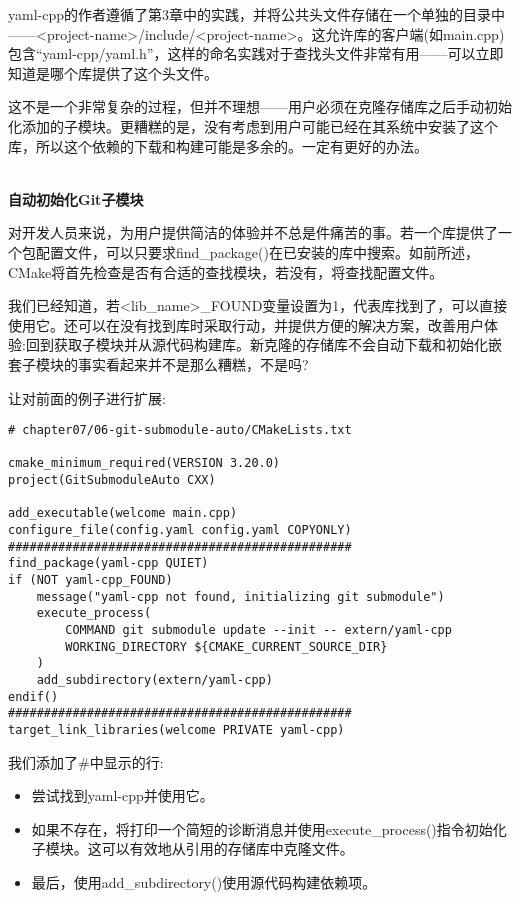 yaml-cpp的作者遵循了第3章中的实践，并将公共头文件存储在一个单独的目录中——<project-name>/include/<project-name>。这允许库的客户端(如main.cpp)包含“yaml-cpp/yaml.h”，这样的命名实践对于查找头文件非常有用——可以立即知道是哪个库提供了这个头文件。

这不是一个非常复杂的过程，但并不理想——用户必须在克隆存储库之后手动初始化添加的子模块。更糟糕的是，没有考虑到用户可能已经在其系统中安装了这个库，所以这个依赖的下载和构建可能是多余的。一定有更好的办法。

\hspace*{\fill} \\ %
\noindent
\textbf{自动初始化Git子模块}

对开发人员来说，为用户提供简洁的体验并不总是件痛苦的事。若一个库提供了一个包配置文件，可以只要求find\_package()在已安装的库中搜索。如前所述，CMake将首先检查是否有合适的查找模块，若没有，将查找配置文件。

我们已经知道，若<lib\_name>\_FOUND变量设置为1，代表库找到了，可以直接使用它。还可以在没有找到库时采取行动，并提供方便的解决方案，改善用户体验:回到获取子模块并从源代码构建库。新克隆的存储库不会自动下载和初始化嵌套子模块的事实看起来并不是那么糟糕，不是吗?

让对前面的例子进行扩展:

\begin{lstlisting}[style=styleCMake]
# chapter07/06-git-submodule-auto/CMakeLists.txt

cmake_minimum_required(VERSION 3.20.0)
project(GitSubmoduleAuto CXX)

add_executable(welcome main.cpp)
configure_file(config.yaml config.yaml COPYONLY)
################################################
find_package(yaml-cpp QUIET)
if (NOT yaml-cpp_FOUND)
	message("yaml-cpp not found, initializing git submodule")
	execute_process(
		COMMAND git submodule update --init -- extern/yaml-cpp
		WORKING_DIRECTORY ${CMAKE_CURRENT_SOURCE_DIR}
	)
	add_subdirectory(extern/yaml-cpp)
endif()
################################################
target_link_libraries(welcome PRIVATE yaml-cpp)
\end{lstlisting}

我们添加了\#中显示的行:

\begin{itemize}
\item 
尝试找到yaml-cpp并使用它。

\item 
如果不存在，将打印一个简短的诊断消息并使用execute\_process()指令初始化子模块。这可以有效地从引用的存储库中克隆文件。

\item 
最后，使用add\_subdirectory()使用源代码构建依赖项。
\end{itemize}

